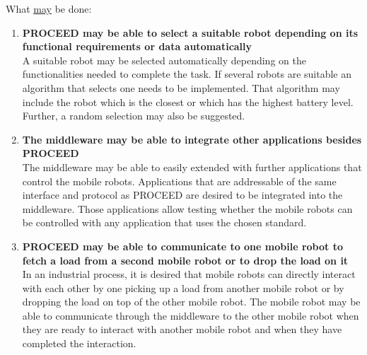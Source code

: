 What \underline{may} be done:
\begin{enumerate}  
   \item \textbf{PROCEED may be able to select a suitable robot depending on its functional requirements or data automatically} \hfill \\ 
	A suitable robot may be selected automatically depending on the functionalities needed to complete the task. If several robots are suitable an algorithm that selects one needs to be implemented. That algorithm may include the robot which is the closest or which has the highest battery level. Further, a random selection may also be suggested.
   \item \textbf{The middleware may be able to integrate other applications besides PROCEED} \hfill \\ 
	The middleware may be able to easily extended with further applications that control the mobile robots. Applications that are addressable of the same interface and protocol as PROCEED are desired to be integrated into the middleware. Those applications allow testing whether the mobile robots can be controlled with any application that uses the chosen standard.
   \item \textbf{PROCEED may be able to communicate to one mobile robot to fetch a load from a second mobile robot or to drop the load on it} \hfill \\ 
	In an industrial process, it is desired that mobile robots can directly interact with each other by one picking up a load from another mobile robot or by dropping the load on top of the other mobile robot. The mobile robot may be able to communicate through the middleware to the other mobile robot when they are ready to interact with another mobile robot and when they have completed the interaction.
\end{enumerate}


